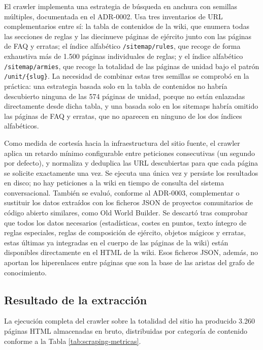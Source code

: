 \documentclass[11pt,a4paper,spanish]{book}
\numberwithin{equation}{chapter}
\numberwithin{figure}{chapter}
\numberwithin{table}{chapter}
\begin{document}
El crawler implementa una estrategia de búsqueda en anchura con semillas múltiples, documentada en el ADR-0002. Usa tres inventarios de URL complementarios entre sí: la tabla de contenidos de la wiki, que enumera todas las secciones de reglas y las diecinueve páginas de ejército junto con las páginas de FAQ y erratas; el índice alfabético \texttt{/sitemap/rules}, que recoge de forma exhaustiva más de 1.500 páginas individuales de reglas; y el índice alfabético \texttt{/sitemap/armies}, que recoge la totalidad de las páginas de unidad bajo el patrón \texttt{/unit/\{slug\}}. La necesidad de combinar estas tres semillas se comprobó en la práctica: una estrategia basada solo en la tabla de contenidos no habría descubierto ninguna de las 574 páginas de unidad, porque no están enlazadas directamente desde dicha tabla, y una basada solo en los sitemaps habría omitido las páginas de FAQ y erratas, que no aparecen en ninguno de los dos índices alfabéticos.

Como medida de cortesía hacia la infraestructura del sitio fuente, el crawler aplica un retardo mínimo configurable entre peticiones consecutivas (un segundo por defecto), y normaliza y deduplica las URL descubiertas para que cada página se solicite exactamente una vez. Se ejecuta una única vez y persiste los resultados en disco; no hay peticiones a la wiki en tiempo de consulta del sistema conversacional. También se evaluó, conforme al ADR-0003, complementar o sustituir los datos extraídos con los ficheros JSON de proyectos comunitarios de código abierto similares, como Old World Builder. Se descartó tras comprobar que todos los datos necesarios (estadísticas, costes en puntos, texto íntegro de reglas especiales, reglas de composición de ejército, objetos mágicos y erratas, estas últimas ya integradas en el cuerpo de las páginas de la wiki) están disponibles directamente en el HTML de la wiki. Esos ficheros JSON, además, no aportan los hiperenlaces entre páginas que son la base de las aristas del grafo de conocimiento.

\subsection{Resultado de la extracción}

La ejecución completa del crawler sobre la totalidad del sitio ha producido 3.260 páginas HTML almacenadas en bruto, distribuidas por categoría de contenido conforme a la Tabla \ref{tab:scraping-metricas}.
\end{document}
